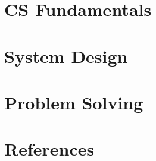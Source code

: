 \section[CS]{CS Fundamentals}

	
	
	
	
	
	
	
	

\section[Sys]{System Design}

	
	

\section[Probs]{Problem Solving}
	


\section[Refs]{References}
	

